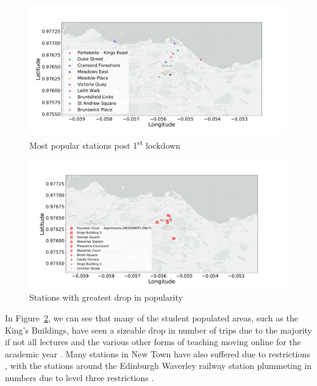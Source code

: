 \documentclass[11pt,a4paper]{article}
\begin{document}
\begin{figure}[H]
    \centering
    \includegraphics[width=\linewidth]{datasets/popular_stations_post_1st_lockdown.pdf}
    \vspace*{-1.3cm}
    \caption{Most popular stations post 1\textsuperscript{st} lockdown}
    \label{post_lockdown_popularity}
\end{figure}
\vspace*{-1cm}
\begin{figure}[h]
    \hspace*{-1cm}
    \includegraphics[scale=0.35]{datasets/stations_most_trips_percentage_drop.pdf}
    \vspace*{-1.2cm}
    \caption{Stations with greatest drop in popularity}
    \label{percentage_popularity}
\end{figure}
In Figure~\ref{percentage_popularity}, we can see that many of the student populated areas, such as the King's Buildings,  have seen a sizeable drop in number of trips due to the majority if not all lectures and the various other forms of teaching moving online for the academic year \cite{online}. Many stations in New Town have also suffered due to restrictions \cite{stores_princess}, with the stations around the Edinburgh Waverley railway station plummeting in numbers due to level three restrictions \cite{waverly}.
\end{document}
